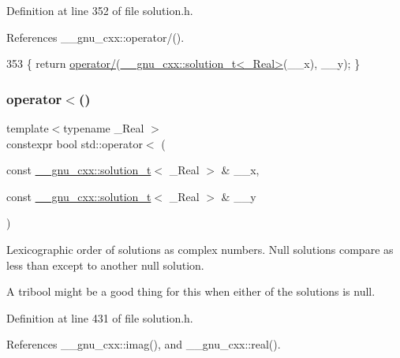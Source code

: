 Definition at line 352 of file solution.\+h.



References \+\_\+\+\_\+gnu\+\_\+cxx\+::operator/().


\begin{DoxyCode}
353     \{ \textcolor{keywordflow}{return} \hyperlink{namespacestd_a51cf4f07903a8d424249d8198c73843d}{operator/}(\hyperlink{namespace____gnu__cxx_ae20ea642de50eb361074c62676b0159c}{\_\_gnu\_cxx::solution\_t<\_Real>}(\_\_x), \_\_y); \}
\end{DoxyCode}
\mbox{\label{namespacestd_a85cfd5c1970e0d79e11521e9af3b4011}} 
\subsubsection{\texorpdfstring{operator$<$()}{operator<()}\hspace{0.1cm}{\footnotesize\ttfamily [1/5]}}
{\footnotesize\ttfamily template$<$typename \+\_\+\+Real $>$ \\
constexpr bool std\+::operator$<$ (\begin{DoxyParamCaption}\item[{const \hyperlink{namespace____gnu__cxx_ae20ea642de50eb361074c62676b0159c}{\+\_\+\+\_\+gnu\+\_\+cxx\+::solution\+\_\+t}$<$ \+\_\+\+Real $>$ \&}]{\+\_\+\+\_\+x,  }\item[{const \hyperlink{namespace____gnu__cxx_ae20ea642de50eb361074c62676b0159c}{\+\_\+\+\_\+gnu\+\_\+cxx\+::solution\+\_\+t}$<$ \+\_\+\+Real $>$ \&}]{\+\_\+\+\_\+y }\end{DoxyParamCaption})}

Lexicographic order of solutions as complex numbers. Null solutions compare as less than except to another null solution.

A tribool might be a good thing for this when either of the solutions is null. 

Definition at line 431 of file solution.\+h.



References \+\_\+\+\_\+gnu\+\_\+cxx\+::imag(), and \+\_\+\+\_\+gnu\+\_\+cxx\+::real().


